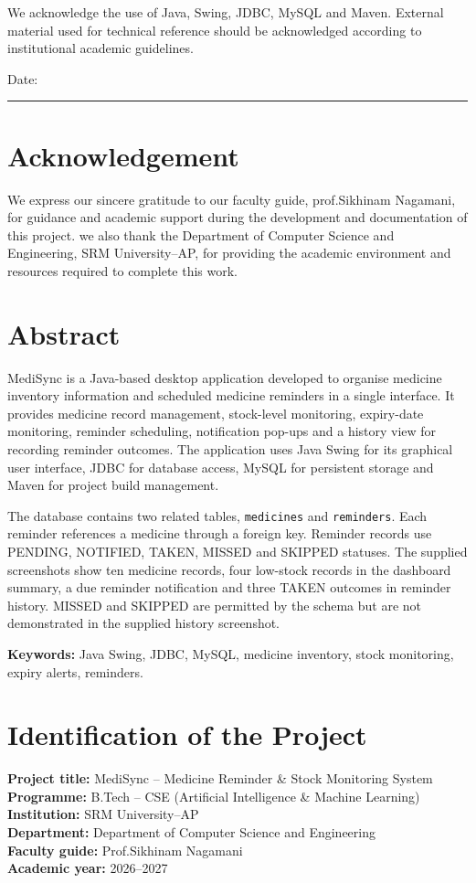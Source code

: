 \documentclass[12pt,a4paper,oneside]{report}
\begin{document}
We acknowledge the use of Java, Swing, JDBC, MySQL and Maven. External material used for technical reference should be acknowledged according to institutional academic guidelines.

\vspace{2cm}
Date: \rule{4cm}{0.4pt}

\chapter*{Acknowledgement}
We express our sincere gratitude to our faculty guide, prof.Sikhinam Nagamani, for guidance and academic support during the development and documentation of this project. we also thank the Department of Computer Science and Engineering, SRM University--AP, for providing the academic environment and resources required to complete this work.

\chapter*{Abstract}
MediSync is a Java-based desktop application developed to organise medicine inventory information and scheduled medicine reminders in a single interface. It provides medicine record management, stock-level monitoring, expiry-date monitoring, reminder scheduling, notification pop-ups and a history view for recording reminder outcomes. The application uses Java Swing for its graphical user interface, JDBC for database access, MySQL for persistent storage and Maven for project build management.

The database contains two related tables, \texttt{medicines} and \texttt{reminders}. Each reminder references a medicine through a foreign key. Reminder records use PENDING, NOTIFIED, TAKEN, MISSED and SKIPPED statuses. The supplied screenshots show ten medicine records, four low-stock records in the dashboard summary, a due reminder notification and three TAKEN outcomes in reminder history. MISSED and SKIPPED are permitted by the schema but are not demonstrated in the supplied history screenshot.

\textbf{Keywords:} Java Swing, JDBC, MySQL, medicine inventory, stock monitoring, expiry alerts, reminders.

\tableofcontents
\listoffigures
\clearpage
{}

\chapter{Identification of the Project}
\textbf{Project title:} MediSync -- Medicine Reminder \& Stock Monitoring System\\
\textbf{Programme:} B.Tech -- CSE (Artificial Intelligence \& Machine Learning)\\
\textbf{Institution:} SRM University--AP\\
\textbf{Department:} Department of Computer Science and Engineering\\
\textbf{Faculty guide:} Prof.Sikhinam Nagamani\\
\textbf{Academic year:} 2026--2027
\end{document}
